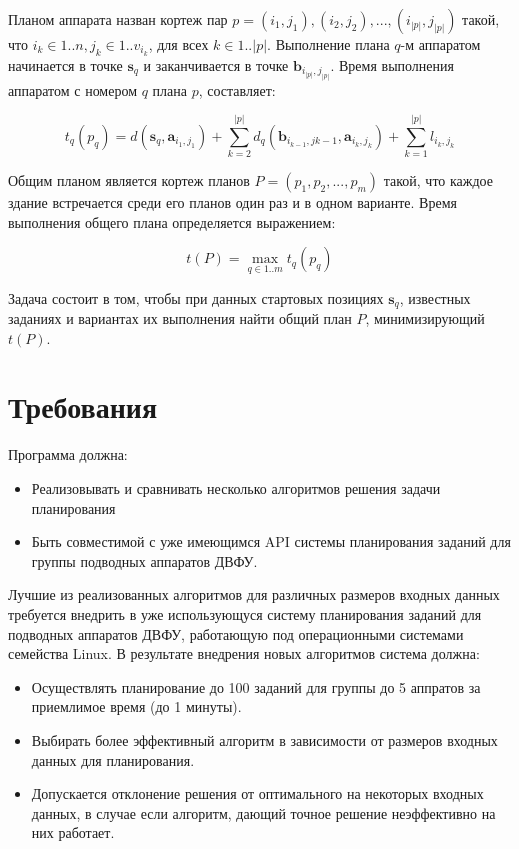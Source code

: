 \documentclass[a4paper,14pt,russian]{article}
\begin{document}
Планом аппарата назван кортеж пар $p = (i_1, j_1), (i_2, j_2), ..., (i_{|p|}, j_{|p|})$ такой, что $i_k \in 1..n, j_k \in 1..v_{i_k}$, для всех $k \in 1..|p|$. Выполнение плана $q$-м аппаратом начинается в точке $\mathbf{s}_q$ и заканчивается в точке $\mathbf{b}_{i_{|p|}, j_{|p|}}$. Время выполнения аппаратом с номером $q$ плана $p$, составляет:

\begin{equation}
t_q(p_q) = d(\mathbf{s}_q, \mathbf{a}_{i_1, j_1}) + \sum_{k=2}^{|p|} d_q(\mathbf{b}_{i_{k-1}, j{k - 1}}, \mathbf{a}_{i_k, j_k}) + \sum_{k=1}^{|p|}l_{i_k, j_k}
\end{equation}

Общим планом является кортеж планов $P = (p_1, p_2, ..., p_m)$ такой, что каждое здание встречается среди его планов один раз и в одном варианте. Время выполнения общего плана определяется выражением:

\begin{equation}
t(P) = \displaystyle \max_{q \in 1..m} t_q(p_q)
\end{equation}

Задача состоит в том, чтобы при данных стартовых позициях $\mathbf{s}_q$, известных заданиях и вариантах их выполнения найти общий план $P$, минимизирующий $t(P)$.


\section{Требования}

Программа должна:
\begin{itemize}
\item Реализовывать и сравнивать несколько алгоритмов решения задачи планирования
\item Быть совместимой с уже имеющимся API системы планирования заданий для группы подводных аппаратов ДВФУ.
\end{itemize}

Лучшие из реализованных алгоритмов для различных размеров входных данных требуется внедрить в уже использующуся систему планирования заданий для подводных аппаратов ДВФУ, работающую под операционными системами семейства Linux. В результате внедрения новых алгоритмов система должна:
\begin{itemize}

\item Осуществлять планирование до 100 заданий для группы до 5 аппратов за приемлимое время (до 1 минуты).
\item Выбирать более эффективный алгоритм в зависимости от размеров входных данных для планирования.
\item Допускается отклонение решения от оптимального на некоторых входных данных, в случае если алгоритм, дающий точное решение неэффективно на них работает.
\end{itemize}
\end{document}
